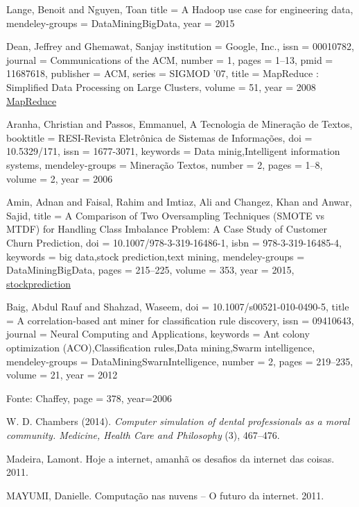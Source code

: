 \documentclass[conference,compsoc]{IEEEtran}
\begin{document}
\begin{thebibliography}{1}
Lange, Benoit and Nguyen, Toan
title = {{A Hadoop use case for engineering data}},
mendeley-groups = {DataMiningBigData},
year = {2015}


Dean, Jeffrey and Ghemawat, Sanjay
institution = {Google, Inc.},
issn = {00010782},
journal = {Communications of the ACM},
number = {1},
pages = {1--13},
pmid = {11687618},
publisher = {ACM},
series = {SIGMOD '07},
title = {{MapReduce : Simplified Data Processing on Large Clusters}},
volume = {51},
year = {2008}
\href{http://portal.acm.org/citation.cfm?id=1327492}{MapReduce}


Aranha, Christian and Passos, Emmanuel,
A Tecnologia de Mineração de Textos,
booktitle = {RESI-Revista Eletrônica de Sistemas de Informações},
doi = {10.5329/171},
issn = {1677-3071},
keywords = {Data minig,Intelligent information systems},
mendeley-groups = {Mineração Textos},
number = {2},
pages = {1--8},
volume = {2},
year = {2006}


Amin, Adnan and Faisal, Rahim and Imtiaz, Ali and Changez, Khan and Anwar, Sajid,
title = {{A Comparison of Two Oversampling Techniques (SMOTE vs MTDF) for Handling Class Imbalance Problem: A Case Study of Customer Churn Prediction}},
doi = {10.1007/978-3-319-16486-1},
isbn = {978-3-319-16485-4},
keywords = {big data,stock prediction,text mining},
mendeley-groups = {DataMiningBigData},
pages = {215--225},
volume = {353},
year = {2015},
\href{http://link.springer.com/10.1007/978-3-319-16486-1}{stockprediction}





Baig, Abdul Rauf and Shahzad, Waseem,
doi = {10.1007/s00521-010-0490-5},
title = {{A correlation-based ant miner for classification rule discovery}},
issn = {09410643},
journal = {Neural Computing and Applications},
keywords = {Ant colony optimization (ACO),Classification rules,Data mining,Swarm intelligence},
mendeley-groups = {DataMiningSwarnIntelligence},
number = {2},
pages = {219--235},
volume = {21},
year = {2012}


Fonte: Chaffey,
page = 378,
year=2006




W. D. Chambers (2014).
\emph{Computer simulation of dental professionals as a moral community. Medicine, Health Care and Philosophy}
(3), 467–476.




Madeira, Lamont. Hoje a internet, amanhã os desafios da internet das coisas. 2011.

MAYUMI, Danielle. Computação nas nuvens – O futuro da internet. 2011.



\end{thebibliography}






\end{document}

